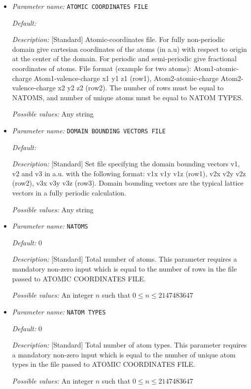 \begin{itemize}
\item {\it Parameter name:} {\tt ATOMIC COORDINATES FILE}
\label{parameters:Geometry/ATOMIC COORDINATES FILE}
\label{parameters:Geometry/ATOMIC_20COORDINATES_20FILE}




{\it Default:} 


{\it Description:} [Standard] Atomic-coordinates file. For fully non-periodic domain give cartesian coordinates of the atoms (in a.u) with respect to origin at the center of the domain. For periodic and semi-periodic give fractional coordinates of atoms. File format (example for two atoms): Atom1-atomic-charge Atom1-valence-charge x1 y1 z1 (row1), Atom2-atomic-charge Atom2-valence-charge x2 y2 z2 (row2). The number of rows must be equal to NATOMS, and number of unique atoms must be equal to NATOM TYPES.


{\it Possible values:} Any string
\item {\it Parameter name:} {\tt DOMAIN BOUNDING VECTORS FILE}
\label{parameters:Geometry/DOMAIN BOUNDING VECTORS FILE}
\label{parameters:Geometry/DOMAIN_20BOUNDING_20VECTORS_20FILE}




{\it Default:} 


{\it Description:} [Standard] Set file specifying the domain bounding vectors v1, v2 and v3 in a.u. with the following format: v1x v1y v1z (row1), v2x v2y v2z (row2), v3x v3y v3z (row3). Domain bounding vectors are the typical lattice vectors in a fully periodic calculation.


{\it Possible values:} Any string
\item {\it Parameter name:} {\tt NATOMS}
\label{parameters:Geometry/NATOMS}




{\it Default:} 0


{\it Description:} [Standard] Total number of atoms. This parameter requires a mandatory non-zero input which is equal to the number of rows in the file passed to ATOMIC COORDINATES FILE.


{\it Possible values:} An integer $n$ such that $0\leq n \leq 2147483647$
\item {\it Parameter name:} {\tt NATOM TYPES}
\label{parameters:Geometry/NATOM TYPES}
\label{parameters:Geometry/NATOM_20TYPES}




{\it Default:} 0


{\it Description:} [Standard] Total number of atom types. This parameter requires a mandatory non-zero input which is equal to the number of unique atom types in the file passed to ATOMIC COORDINATES FILE.


{\it Possible values:} An integer $n$ such that $0\leq n \leq 2147483647$
\end{itemize}
